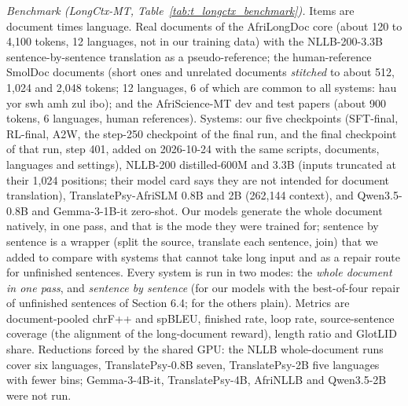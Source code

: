 \emph{Benchmark (LongCtx-MT, Table~\ref{tab:t_longctx_benchmark}).} Items are document times language. Real documents of the AfriLongDoc core (about 120 to 4,100 tokens, 12 languages, not in our training data) with the NLLB-200-3.3B sentence-by-sentence translation as a pseudo-reference; the human-reference SmolDoc documents (short ones and unrelated documents \emph{stitched} to about 512, 1,024 and 2,048 tokens; 12 languages, 6 of which are common to all systems: hau yor swh amh zul ibo); and the AfriScience-MT dev and test papers (about 900 tokens, 6 languages, human references). Systems: our five checkpoints (SFT-final, RL-final, A2W, the step-250 checkpoint of the final run, and the final checkpoint of that run, step 401, added on 2026-10-24 with the same scripts, documents, languages and settings), NLLB-200 distilled-600M and 3.3B (inputs truncated at their 1,024 positions; their model card says they are not intended for document translation), TranslatePsy-AfriSLM 0.8B and 2B (262,144 context), and Qwen3.5-0.8B and Gemma-3-1B-it zero-shot. Our models generate the whole document natively, in one pass, and that is the mode they were trained for; sentence by sentence is a wrapper (split the source, translate each sentence, join) that we added to compare with systems that cannot take long input and as a repair route for unfinished sentences. Every system is run in two modes: the \emph{whole document in one pass}, and \emph{sentence by sentence} (for our models with the best-of-four repair of unfinished sentences of Section 6.4; for the others plain). Metrics are document-pooled chrF++ and spBLEU, finished rate, loop rate, source-sentence coverage (the alignment of the long-document reward), length ratio and GlotLID share. Reductions forced by the shared GPU: the NLLB whole-document runs cover six languages, TranslatePsy-0.8B seven, TranslatePsy-2B five languages with fewer bins; Gemma-3-4B-it, TranslatePsy-4B, AfriNLLB and Qwen3.5-2B were not run.

